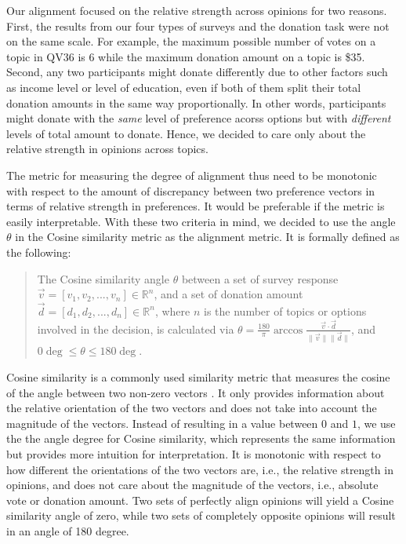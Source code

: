 Our alignment focused on the relative strength across opinions for two reasons. 
First, the results from our four types of surveys 
and the donation task were not on the same scale. 
For example, the maximum possible number of votes on a topic 
in QV36 is 6 
while the maximum donation amount on a topic is \$35. 
Second, 
any two participants might donate differently
due to other factors such as income level or level of education,
even if both of them split their total donation amounts in the same way proportionally.
In other words, 
participants might donate with the \textit{same} level of preference acorss options 
but with \textit{different} levels of total amount to donate.
Hence, we decided to care only about the relative strength in opinions across topics.

The metric for measuring the degree of alignment 
thus need to be monotonic 
with respect to the amount of discrepancy 
between two preference vectors 
in terms of relative strength in preferences. 
It would be preferable if the metric is easily interpretable. 
With these two criteria in mind, 
we decided to use the angle $\theta$ in the Cosine similarity metric 
as the alignment metric. 
It is formally defined as the following: \par

\begin{quote}
    The Cosine similarity angle $\theta$ between a set of survey response $\vec{v} = [v_1, v_2, ..., v_n] \in \mathbb{R}^n$, and a set of donation amount $\vec{d} = [d_1, d_2, ..., d_n] \in \mathbb{R}^n$, where $n$ is the number of topics or options involved in the decision, is calculated via $\theta = \frac{180}{\pi} \arccos{\frac{\vec{v} \cdot \vec{d}}{\|\vec{v}\| \|\vec{d}\|}}$, and $0\deg \leq \theta \leq 180\deg$.
\end{quote}

Cosine similarity is a commonly used similarity metric 
that measures the cosine of the angle 
between two non-zero vectors \cite{singhal2001modern}. 
It only provides information about 
the relative orientation 
of the two vectors and 
does not take into account 
the magnitude of the vectors. 
Instead of resulting in a value between $0$ and $1$,
we use the the angle degree for Cosine similarity,
which represents the same information 
but provides more intuition for interpretation.
It is monotonic with respect to 
how different the orientations of the two vectors are,
i.e., the relative strength in opinions, 
and does not care about the magnitude of the vectors, 
i.e., absolute vote or donation amount. 
Two sets of perfectly align opinions 
will yield a Cosine similarity angle of zero, 
while two sets of completely opposite opinions 
will result in an angle of 180 degree.

